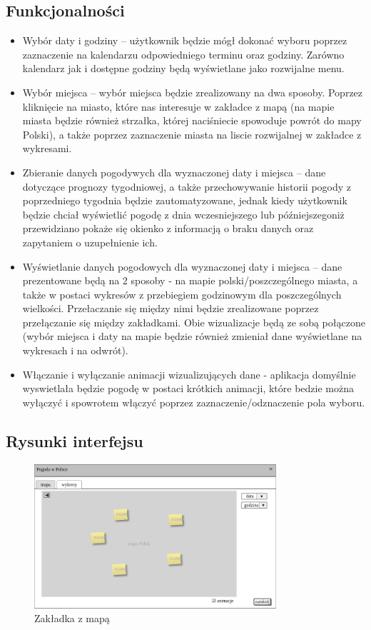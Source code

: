 \documentclass[10pt, a4paper]{article}
\begin{document}
\subsection{Funkcjonalności}
\begin{itemize}
    \item Wybór daty i godziny -- użytkownik będzie mógł dokonać wyboru poprzez zaznaczenie na kalendarzu odpowiedniego terminu oraz godziny. Zarówno kalendarz jak i dostępne godziny będą wyświetlane jako rozwijalne menu.
    \item Wybór miejsca -- wybór miejsca będzie zrealizowany na dwa sposoby. Poprzez kliknięcie na miasto, które nas interesuje w zakładce z mapą (na mapie miasta będzie również strzałka, której naciśniecie spowoduje powrót do mapy Polski), a także poprzez zaznaczenie miasta na liscie rozwijalnej w zakładce z wykresami.
    \item Zbieranie danych pogodywych dla wyznaczonej daty i miejsca -- dane dotyczące prognozy tygodniowej, a także przechowywanie historii pogody z poprzedniego tygodnia będzie zautomatyzowane, jednak kiedy użytkownik będzie chciał wyświetlić pogodę z dnia wczesniejszego lub późniejszegoniż przewidziano pokaże się okienko z informacją o braku danych oraz zapytaniem o uzupełnienie ich.
    \item Wyświetlanie danych pogodowych dla wyznaczonej daty i miejsca -- dane prezentowane będą na 2 sposoby - na mapie polski/poszczególnego miasta, a także w postaci wykresów z przebiegiem godzinowym dla poszczególnych wielkości. Przełaczanie się między nimi będzie zrealizowane poprzez przełączanie się między zakładkami. Obie wizualizacje będą ze sobą połączone (wybór miejsca i daty na mapie będzie również zmieniał dane wyświetlane na wykresach i na odwrót). 
    \item Włączanie i wyłączanie animacji wizualizujących dane - aplikacja domyślnie wyswietlała będzie pogodę w postaci krótkich animacji, które bedzie można wyłączyć i spowrotem włączyć poprzez zaznaczenie/odznaczenie pola wyboru.
\end{itemize}
\subsection{Rysunki interfejsu}
\begin{figure}[h]
    \centering
	\includegraphics[width=0.80\textwidth]{rysunek_mapa.png}
	\caption{Zakładka z mapą}
\end{figure}
\end{document}
